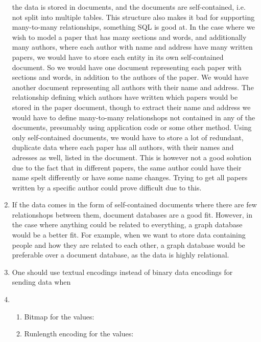 \begin{enumerate}
        the data is stored in documents, and the documents are self-contained,
        i.e. not split into multiple tables. This structure also makes it bad 
        for supporting many-to-many relationships, something SQL is good at. In
        the case where we wish to model a paper that has many sections and 
        words, and additionally many authors, where each author with name and 
        address have many written papers, we would have to store each entity
        in its own self-contained document. So we would have one document
        representing each paper with sections and words, in addition to the 
        authors of the paper. We would have another document representing all 
        authors with their name and address. The relationship defining which
        authors have written which papers would be stored in the paper document,
        though to extract their name and address we would have to define 
        many-to-many relationshops not contained in any of the documents,
        presumably using application code or some other method. Using only
        self-contained documents, we would have to store a lot of redundant, 
        duplicate data where each paper has all authors, with their names and 
        adresses as well, listed in the document. This is however not a good 
        solution due to the fact that in different papers, the same author could
        have their name spelt differently or have some name changes. Trying
        to get all papers written by a specific author could prove difficult
        due to this.
    \item 
        If the data comes in the form of self-contained documents where there 
        are few relationshops between them, document databases are a good fit.
        However, in the case where anything could be related to everything, a 
        graph database would be a better fit. For example, when we want to store
        data containing people and how they are related to each other, a graph
        database would be preferable over a document database, as the data is
        highly relational.
    \item 
        One should use textual encodings instead of binary data encodings for 
        sending data when 
    \item 
        \begin{enumerate}
            \item 
                Bitmap for the values:
            \item 
                Runlength encoding for the values:

\end{enumerate}
\end{enumerate}
